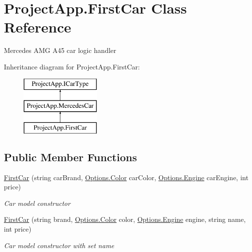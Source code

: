 \hypertarget{class_project_app_1_1_first_car}{}\section{Project\+App.\+First\+Car Class Reference}
\label{class_project_app_1_1_first_car}


Mercedes A\+MG A45 car logic handler  


Inheritance diagram for Project\+App.\+First\+Car\+:\begin{figure}[H]
\begin{center}
\leavevmode
\includegraphics[height=3.000000cm]{class_project_app_1_1_first_car}
\end{center}
\end{figure}
\subsection*{Public Member Functions}
\begin{DoxyCompactItemize}
\item 
\mbox{\hyperlink{class_project_app_1_1_first_car_aec81c88fba266b07f24926e47e29d55c}{First\+Car}} (string car\+Brand, \mbox{\hyperlink{class_project_app_1_1_options_aaa68b08af20deeebf73e6bc6de725c44}{Options.\+Color}} car\+Color, \mbox{\hyperlink{class_project_app_1_1_options_a95e313182e8122da719f7c8caefcc88d}{Options.\+Engine}} car\+Engine, int price)
\begin{DoxyCompactList}\small\item\em Car model constructor \end{DoxyCompactList}\item 
\mbox{\hyperlink{class_project_app_1_1_first_car_aaf059134553befb37c06f1acd2fd9cb1}{First\+Car}} (string brand, \mbox{\hyperlink{class_project_app_1_1_options_aaa68b08af20deeebf73e6bc6de725c44}{Options.\+Color}} color, \mbox{\hyperlink{class_project_app_1_1_options_a95e313182e8122da719f7c8caefcc88d}{Options.\+Engine}} engine, string name, int price)
\begin{DoxyCompactList}\small\item\em Car model constructor with set name \end{DoxyCompactList}\end{DoxyCompactItemize}
